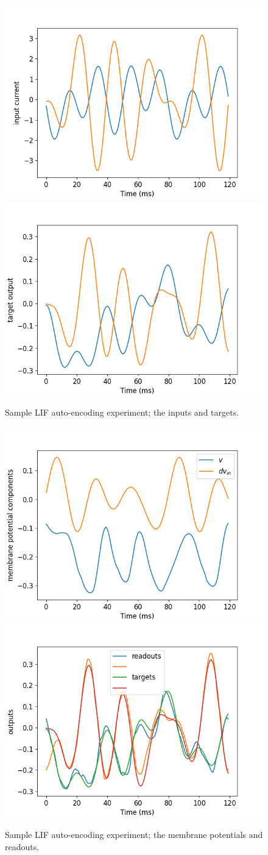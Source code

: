 \documentclass[mphil,deptreport,ianc]{infthesis} %
\begin{document}
\begin{figure}[!h]
    \centering
    \includegraphics[width=0.49\columnwidth]{figures/Supplementary/gating/LIF/AutoEncoding/01-04_16-35-37-680/test_plot_inputs_LIF_23.png}
    \includegraphics[width=0.49\columnwidth]{figures/Supplementary/gating/LIF/AutoEncoding/01-04_16-35-37-680/test_plot_itargets_LIF_23.png}
    \caption{Sample LIF auto-encoding experiment; the inputs and targets.}
    \label{fig:LIF_AE_1_inputs_targets}
\end{figure}

\begin{figure}[!h]
    \centering
    \includegraphics[width=0.49\columnwidth]{figures/Supplementary/gating/LIF/AutoEncoding/01-04_16-35-37-680/test_plot_mem_voltage_single_neuron_LIF_seed__23.png}
    \includegraphics[width=0.49\columnwidth]{figures/Supplementary/gating/LIF/AutoEncoding/01-04_16-35-37-680/test_plot_outputs_LIF_seed_23.png}
    \caption{Sample LIF auto-encoding experiment; the membrane potentials and readouts.}
    \label{fig:LIF_AE_1_inputs_targets}
\end{figure}
\end{document}
